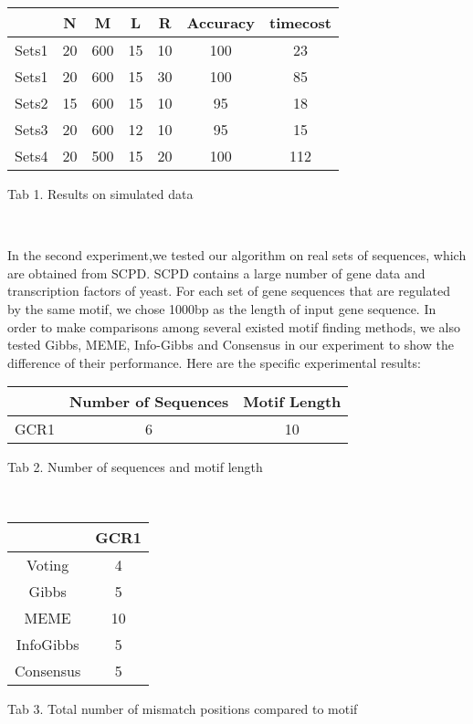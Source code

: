 \documentclass[11pt]{article}
\begin{document}
\begin{center}
\begin{tabular}{|c|c|c|c|c|c|c|}
\hline
 &N & M & L & R & Accuracy & timecost \\ [0.5ex]
\hline
Sets1&20 & 600 & 15 & 10 & 100 & 23\\
Sets1&20 & 600 & 15 & 30 & 100 & 85\\
Sets2&15 & 600 & 15 & 10 & 95 & 18\\
Sets3&20 & 600 & 12 & 10 & 95 & 15\\
Sets4&20 & 500 & 15 & 20 & 100 & 112\\
\hline

\end{tabular}
\end{center}

\begin{center}
Tab 1. Results on simulated data
\end{center}
\


In the second experiment,we tested our algorithm on real sets of
sequences, which are obtained from SCPD. SCPD contains a large
number of gene data and transcription factors of yeast. For each set
of gene sequences that are regulated by the same motif, we chose
1000bp as the length of input gene sequence. In order to make
comparisons among several existed motif finding methods, we also
tested Gibbs, MEME, Info-Gibbs and Consensus in our experiment to
show the difference of their performance. Here are the specific
experimental results:


\begin{center}
\begin{tabular}{|c|c|c|}
\hline
 & Number of Sequences & Motif Length\\ [0.5ex]
\hline
GCR1 & 6 & 10\\
\hline
\end{tabular}
\end{center}

\begin{center}
Tab 2. Number of sequences and motif length
\end{center}




\
\begin{center}
\begin{tabular}{|c|c|}
\hline & GCR1\\ [0.5ex] \hline
Voting& 4 \\
Gibbs& 5 \\
MEME& 10\\
InfoGibbs& 5\\
Consensus& 5\\
\hline
\end{tabular}
\end{center}
\begin{center}
Tab 3. Total number of mismatch positions compared to motif
\end{center}
\end{document}
